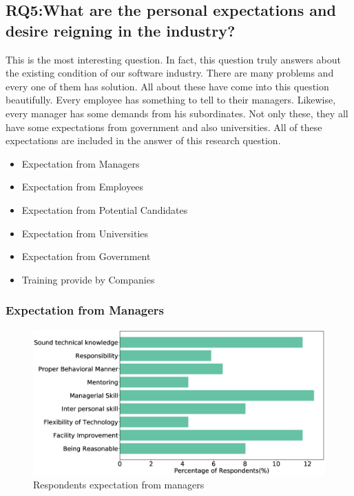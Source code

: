 \subsection{RQ5:What are the personal expectations and desire reigning in the industry?}
\label{RQ5}
This is the most interesting question. In fact, this question truly answers about the existing condition of our software industry. There are many problems and every one of them has solution. All about these have come into this question beautifully. Every employee has something to tell to their managers. Likewise, every manager has some demands from his subordinates. Not only these, they all have some expectations from government and also universities. All of these expectations are included in the answer of this research question.

\begin{itemize}
    \item Expectation from Managers
    \item Expectation from Employees
    \item Expectation from Potential Candidates
    \item Expectation from Universities
    \item Expectation from Government
    \item Training provide by Companies
\end{itemize}


\subsubsection{Expectation from Managers}
\label{Expectation from Managers}
\begin{figure}[htbp]
\includegraphics[scale=0.28]{Figures/Managers_Expectation.eps} 
\caption{Respondents expectation from managers}
\label{fig:managers expectation}
\end{figure}

